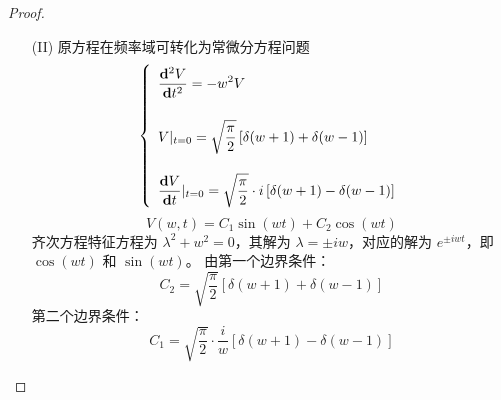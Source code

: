\documentclass[linespread=1.5,openany]{book}%
\theoremstyle{plain}
\begin{document}
{{{\begin{proof}
\begin{itemize}
							于是：\[
							\frac{\partial V}{\partial t}(w, t)=	\frac{\partial  }{\partial t}\mathcal{F}_1(u(x, t)) =\frac{1}{\sqrt{2\pi}}\frac{\partial }{\partial t} \int_{-\infty}^{\infty} u(x, t) e^{-iwx} dx\] \[=\frac{1}{\sqrt{2\pi}} \int_{-\infty}^{\infty} \frac{\partial u}{\partial t}(x, t) e^{-iwx} dx = \mathcal{F}_1\left( \frac{\partial u}{\partial t}(x, t) \right)\]
							即微分和$\mathcal{F}_1$能够换序
							\[\frac{\partial}{\partial t}(\mathcal{F}_1 u(x, t))=\mathcal{F}_1\left( \frac{\partial u}{\partial t} \right)(w, t)  \]
							同样
							\[\frac{\partial^2}{\partial t^2}(\mathcal{F}_1 u(x, t))=\mathcal{F}_1\left( \frac{\partial^2 u}{\partial t^2} \right)(w, t)  \]
							\[\mathcal{F}_1\left( \frac{\partial u}{\partial t} \right)(w, t) = \frac{\partial}{\partial t} V(w, t) \quad \text{(视 \(w\) 为常数)}\]\[
							\mathcal{F}_1\left( \frac{\partial^2 u}{\partial t^2} \right)(w, t) =  \frac{\partial^2 u}{\partial t^2} V(w, t)\]\[
							\mathcal{F}_1\left( \frac{\partial  u}{\partial x } \right)(w, t) = (iw)  V(w, t)
							\]\[
							\mathcal{F}_1\left( \frac{\partial^2 u}{\partial x^2} \right)(w, t) = (iw)^2 V(w, t)
							\]\[
							\mathcal{F}_1\left( \sin x \right)(w) = \sqrt{\frac{\pi}{2}} i \left[ \delta(w + 1) - \delta(w - 1) \right]\]
							\[		\mathcal{F}_1\left( \cos x \right)(w) = \sqrt{\frac{\pi}{2}} \left[ \delta(w + 1) + \delta(w - 1) \right]\]
							\item [(II)]原方程在频率域可转化为常微分方程问题
							\[
							\left\{ \begin{array}{l}
								\renewcommand{\arraystretch}{2.0} %
								\large \displaystyle \frac{ \mathbf{d}^2 V}{\mathbf{d}t^2}= -w^2V   \\[0.5cm] %
								\large \displaystyle V|_{t=0}= \sqrt{\frac{\pi}{2}} \left[ \delta(w + 1) + \delta(w - 1) \right] \\[0.5cm]
								\large \displaystyle \frac{\mathbf{d}V}{\mathbf{d}t}|_{t=0} = \sqrt{\frac{\pi}{2}} \cdot i \left[ \delta(w + 1) - \delta(w - 1) \right] 	
							\end{array} \right.
							\]
							\[V(w, t) = C_1 \sin(wt) + C_2 \cos(wt)\]
							齐次方程特征方程为 \(\lambda^2 + w^2 = 0\)，其解为 \(\lambda = \pm iw\)，对应的解为 \(e^{\pm iwt}\)，即 \(\cos(wt)\) 和 \(\sin(wt)\)。
							由第一个边界条件：\[
							C_2 = \sqrt{\frac{\pi}{2}} \left[ \delta(w + 1) + \delta(w - 1) \right]\]
							第二个边界条件：\[	C_1 = \sqrt{\frac{\pi}{2}} \cdot \frac{i}{w} \left[ \delta(w + 1) - \delta(w - 1) \right]\]	

\end{itemize}
\end{proof}}}}
\end{document}
